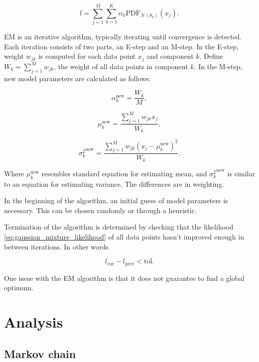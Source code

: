 \documentclass[thesis=B,english]{FITthesis}[2012/06/26]
\begin{document}
\begin{equation} \label{eq:gaussian_mixture_likelihood}
l = \sum_{j=1}^{M} \sum_{k=1}^{K} \alpha_k \text{PDF}_{\mathcal{N}(\theta_k)}(x_j).
\end{equation}

EM is an iterative algorithm, typically iterating until convergence is detected. Each iteration consists of two parts, an E-step and an M-step. In the E-step, weight $w_{jk}$ is computed for each data point $x_j$ and component $k$. Define $W_k = \sum_{j=1}^{M} w_{jk}$, the weight of all data points in component $k$. In the M-step, new model parameters are calculated as follows:

\begin{equation*}
\alpha_k^{\text{new}} = \frac{W_k}{M},
\end{equation*}

\begin{equation*}
\mu_k^{\text{new}} = \frac{\sum_{j=1}^M w_{jk} x_j}{W_k},
\end{equation*}

\begin{equation*}
{\sigma_k^{2}}^{\text{new}} = \frac{\sum_{j=1}^M w_{jk} (x_j-\mu_k^{\text{new}})^2}{W_k}.
\end{equation*}

Where $\mu_k^{\text{new}}$ resembles standard equation for estimating mean, and 
${\sigma_k^{2}}^{\text{new}}$ is similar to an equation for estimating variance. The differences are in weighting.

In the beginning of the algorithm, an initial guess of model parameters is necessary. This can be chosen randomly or through a heuristic.

Termination of the algorithm is determined by checking that the likelihood \ref{eq:gaussian_mixture_likelihood} of all data points hasn't improved enough in between iterations. In other words

\begin{equation*}
l_{\text{cur}} - l_{\text{prev}} < \text{tol}.
\end{equation*}

One issue with the EM algorithm is that it does not guarantee to find a global optimum.

\chapter{Analysis}

\section{Markov chain}
\end{document}
